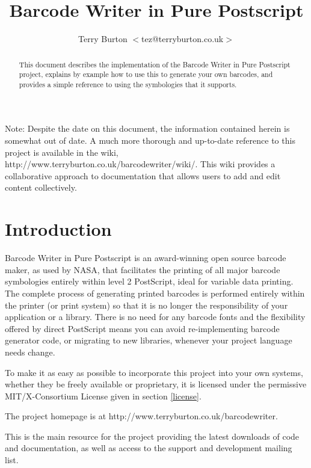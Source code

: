 \documentclass []{article}
\title{Barcode Writer in Pure Postscript}
\author{Terry Burton $<$tez@terryburton.co.uk$>$}
\begin{document}

\maketitle

\begin{abstract}
This document describes the implementation of the Barcode Writer in
Pure Postscript project, explains by example how to use this to
generate your own barcodes, and provides a simple reference to using 
the symbologies that it supports.
\end{abstract}

Note: Despite the date on this document, the information contained herein
is somewhat out of date. A much more thorough and up-to-date reference 
to this project is available in the wiki, 
\mbox{http://www.terryburton.co.uk/barcodewriter/wiki/}. This wiki provides
a collaborative approach to documentation that allows users to add and edit
content collectively.

\newpage

\tableofcontents

\newpage


\section{Introduction}
Barcode Writer in Pure Postscript is an award-winning open source 
barcode maker, as used by NASA, that facilitates the printing of all 
major barcode symbologies entirely within level 2 PostScript, ideal 
for variable data printing. The complete process of generating 
printed barcodes is performed entirely within the printer (or print 
system) so that it is no longer the responsibility of your 
application or a library. There is no need for any barcode fonts and 
the flexibility offered by direct PostScript means you can avoid 
re-implementing barcode generator code, or migrating to new 
libraries, whenever your project language needs change.

To make it as easy as possible to incorporate this project into 
your own systems, whether they be freely available or proprietary, 
it is licensed under the permissive
MIT/X-Consortium License given in section \ref{license}.

The project homepage is at
http://www.terryburton.co.uk/barcodewriter.

This is the main resource for the project providing the latest
downloads of code and documentation, as well as access to the
support and development mailing list.
\end{document}
